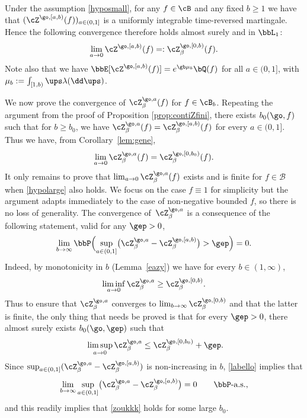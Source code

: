 \begin{cor}\label{lem:gene}
Under the assumption \eqref{hyposmall}, for any $f\in \cB$ and any fixed $b\geq 1$ we have that $(\cZ^{\go,[a,b)}(f))_{a\in(0,1]}$ is a uniformly integrable time-reversed martingale.
Hence the following convergence therefore holds almost surely and in $\bbL_1$:
\[
\lim_{a\to 0}\cZ^{\go,[a,b)}(f) =:\cZ^{\go,[0,b)}_\beta(f).
\]
Note also that we have $\bbE[ \cZ^{\go,[a,b)}(f) ] = e^{\gb \mu_b} \bQ(f)$ for all $a\in (0,1]$, with $\mu_b:= \int_{[1,b)} \ups \lambda(\dd \ups)$.
\end{cor}
We now prove the convergence of $\cZ^{\go,a}_\beta(f)$ for $f\in \cB_b$. Repeating the argument from the proof of Proposition \ref{prop:contiZfini}, there exists $b_0(\go,f)$ such that
for $b\ge b_0$, we have $\cZ^{\go,a}_\beta(f)=\cZ^{\go,[a,b)}_\beta(f)$ for every $a\in(0,1]$. Thus we have, from Corollary~\ref{lem:gene},
\begin{equation*}
\lim_{a\to 0}\cZ^{\go,a}_\beta(f)=\cZ^{\go,[0,b_0)}_\beta(f).
\end{equation*}
It only remains to prove that $\lim_{a\to 0}\cZ^{\go,a}_{\beta}(f)$ exists and is finite for $f\in \mathcal B$ when \eqref{hypolarge} also holds. We focus on the case $f\equiv 1$ for simplicity but the argument adapts immediately to the case of non-negative bounded $f$, so there is no loss of generality.
The convergence of~$\cZ^{\go,a}_\beta$ is a consequence of the following statement, valid
for any $\gep>0$,
\begin{equation}\label{labello}
\lim_{b\to \infty} \bbP\Bigl(\sup_{a\in(0,1]}\bigl(\cZ^{\go,a}_\beta - \cZ^{\go,[a,b)}_\beta\bigr) >\gep \Bigr) = 0.
\end{equation}
Indeed, by monotonicity in $b$ (\cf Lemma~\ref{eazy}) we have for every $b\in (1,\infty)$,
\[
\liminf_{a\to 0}\cZ^{\go,a}_\beta \ge
\cZ^{\go,[0,b)}_\beta.
\] Thus to ensure that $\cZ^{\go,a}_\beta$ converges to $\lim_{b\to \infty}\cZ^{\go,[0,b)}_\beta$ and that the latter is finite,
the only thing that needs be proved is that for every $\gep>0$, there almost surely exists $b_0(\go,\gep)$ such that
\begin{equation}\label{zoukkk}
\ \limsup_{a\to 0}\cZ^{\go,a}_\beta \le \cZ^{\go,[0,b_0)}_\beta+\gep.
\end{equation}
Since $\sup_{a\in(0,1]}(\cZ^{\go,a}_\beta - \cZ^{\go,[a,b)}_\beta)$ is non-increasing in $b$,
\eqref{labello} implies that
\begin{equation}
\label{labellobis}
\lim_{b\to\infty} \sup_{a\in(0,1]}\bigl(\cZ^{\go,a}_\beta - \cZ^{\go,[a,b)}_\beta \bigr) =0 \qquad \bbP\text{-a.s.},
\end{equation}
and this readily implies that \eqref{zoukkk} holds for some large $b_0$.

